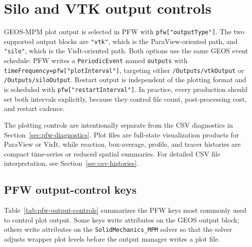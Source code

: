 \section{Silo and VTK output controls}
\label{sec:pfw-output-controls}

GEOS-MPM plot output is selected in PFW with \texttt{pfw["outputType"]}.  The two supported output blocks are \texttt{"vtk"}, which is the ParaView-oriented path, and \texttt{"silo"}, which is the VisIt-oriented path.  Both options use the same GEOS event schedule: PFW writes a \texttt{PeriodicEvent} named \texttt{outputs} with \texttt{timeFrequency=pfw["plotInterval"]}, targeting either \texttt{/Outputs/vtkOutput} or \texttt{/Outputs/siloOutput}.  Restart output is independent of the plotting format and is scheduled with \texttt{pfw["restartInterval"]}.  In practice, every production  should set both intervals explicitly, because they control file count, post-processing cost, and restart cadence.

The plotting controls are intentionally separate from the CSV diagnostics in Section~\ref{sec:pfw-diagnostics}.  Plot files are full-state visualization products for ParaView or VisIt, while reaction, box-average, profile, and tracer histories are compact time-series or reduced spatial summaries.  For detailed CSV file interpretation, see Section~\ref{sec:csv-histories}.

\subsection{PFW output-control keys}
\label{sec:pfw-output-control-keys}

Table~\ref{tab:pfw-output-controls} summarizes the PFW keys most commonly used to control plot output.  Some keys write attributes on the GEOS output block; others write attributes on the \texttt{SolidMechanics\_MPM} solver so that the solver adjusts wrapper plot levels before the output manager writes a plot file.

